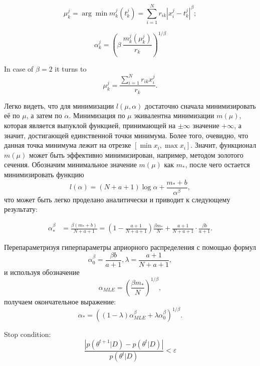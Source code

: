 \documentclass[12pt]{article}
\theoremstyle{definition}
\theoremstyle{plain}
\begin{document}
$$
\mu^j_k = \arg \min m_k^j(t_k^j) = \sum_{i = 1}^N r_{ik} |x_i^j - t_k^j|^\beta ;
$$

$$
\alpha^j_k = \left( \beta~\frac{m_k^j (\mu^j_k) }{r_k} \right)^{1 / \beta}
$$


In case of $\beta = 2$ it turns to
$$
\mu^j_k = \frac{\sum_{i = 1}^N r_{ik} x_i^j}{r_k}.
$$

Легко видеть, что для минимизации $l(\mu, \alpha)$ достаточно сначала минимизировать
её по $\mu$, а затем по $\alpha$. Минимизация по $\mu$ экивалентна минимизации 
$m(\mu)$, которая является выпуклой функцией, принимающей на $\pm \infty$ значение
$+ \infty$, а значит, достигающей единственной точки минимума. Более того, очевидно,
что данная точка минимума лежит на отрезке 
$[\min x_i, \max x_i]$. Значит, функционал $m(\mu)$ может быть эффективно минимизирован,
например, методом золотого сечения. Обозначим минимальное 
значение $m(\mu)$ как $m_*$, после чего остается минимизировать функцию
$$
l(\alpha) = (N + a + 1)\log{\alpha} + \frac{m_* + b}{\alpha^\beta},
$$
что может быть легко проделано аналитически и приводит к следующему результату:

\begin{align*}
\alpha_*^\beta &= \frac{\beta(m_* + b)}{N + a + 1} = 
\left(1 - \frac{a + 1}{N + a + 1} \right) \frac{\beta m_*}{N} +
\frac{a + 1}{N + a + 1} \cdot \frac{\beta b}{a + 1}.
\end{align*}

Перепараметризуя гиперпараметры априорного распределения с помощью формул
$$
\alpha_0^\beta = \frac{\beta b}{a + 1}, \lambda = \frac{a + 1}{N + a + 1},
$$
и используя обозначение
$$\alpha_{MLE} = \left(\frac{\beta m_*}{N}\right)^{1 / \beta},$$
получаем окончательное выражение:
$$
\alpha_* = 
\left((1 - \lambda) \alpha_{MLE}^\beta + \lambda \alpha_0^\beta \right)^{1 / \beta}.
$$

Stop condition:
$$
\frac{\left|p(\theta^{t+1} | D) - p(\theta^{t} | D)\right|}{p(\theta^{t} | D)} < \varepsilon
$$
		
		
\end{document}
